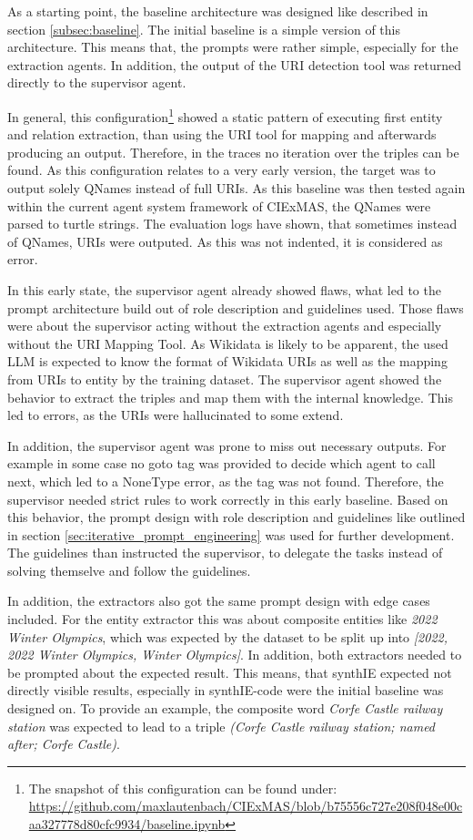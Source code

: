 \documentclass[a4paper,oneside,bibliography=totoc]{scrbook}
\begin{document}
As a starting point, the baseline architecture was designed like described in section \ref{subsec:baseline}. The initial baseline is a simple version of this architecture. This means that, the prompts were rather simple, especially for the extraction agents. In addition, the output of the URI detection tool was returned directly to the supervisor agent.

In general, this configuration\footnote{The snapshot of this configuration can be found under: \url{https://github.com/maxlautenbach/CIExMAS/blob/b75556c727e208f048e00caa327778d80cfc9934/baseline.ipynb}} showed a static pattern of executing first entity and relation extraction, than using the URI tool for mapping and afterwards producing an output. Therefore, in the traces no iteration over the triples can be found. As this configuration relates to a very early version, the target was to output solely QNames instead of full URIs. As this baseline was then tested again within the current agent system framework of CIExMAS, the QNames were parsed to turtle strings. The evaluation logs have shown, that sometimes instead of QNames, URIs were outputed. As this was not indented, it is considered as error.

In this early state, the supervisor agent already showed flaws, what led to the prompt architecture build out of role description and guidelines used. Those flaws were about the supervisor acting without the extraction agents and especially without the URI Mapping Tool. As Wikidata is likely to be apparent, the used \ac{LLM} is expected to know the format of Wikidata URIs as well as the mapping from URIs to entity by the training dataset. The supervisor agent showed the behavior to extract the triples and map them with the internal knowledge. This led to errors, as the URIs were hallucinated to some extend.

In addition, the supervisor agent was prone to miss out necessary outputs. For example in some case no goto tag was provided to decide which agent to call next, which led to a NoneType error, as the tag was not found. Therefore, the supervisor needed strict rules to work correctly in this early baseline. Based on this behavior, the prompt design with role description and guidelines like outlined in section \ref{sec:iterative_prompt_engineering} was used for further development. The guidelines than instructed the supervisor, to delegate the tasks instead of solving themselve and follow the guidelines.

In addition, the extractors also got the same prompt design with edge cases included. For the entity extractor this was about composite entities like \textit{2022 Winter Olympics}, which was expected by the dataset to be split up into \textit{[2022, 2022 Winter Olympics, Winter Olympics]}. In addition, both extractors needed to be prompted about the expected result. This means, that synthIE expected not directly visible results, especially in synthIE-code were the initial baseline was designed on. To provide an example, the composite word \textit{Corfe Castle railway station} was expected to lead to a triple \textit{(Corfe Castle railway station; named after; Corfe Castle)}.
\end{document}
